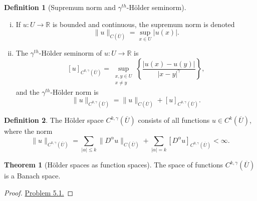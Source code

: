 \documentclass[11pt]{article}
\theoremstyle{definition}
\newtheorem*{theorem}{Theorem}
\newtheorem*{definition}{Definition}
\begin{document}
\begin{definition}[Supremum norm and $\gamma^{th}$-H\"{o}lder seminorm]
\begin{enumerate}[(i)]
\item If $u : U \rightarrow \mathbb{R}$ is bounded and continuous, the supremum norm is denoted
\[\|u\|_{C(\overline{U})} = \sup_{x \in U}{|u(x)|}.\]

\item The $\gamma^{th}$-H\"{o}lder seminorm of $u : U \rightarrow \mathbb{R}$ is
\[[u]_{C^{0,\gamma}(\overline{U})} = \sup_{\substack{x,y\in U \\ x\not= y}}\left\{\frac{|u(x) - u(y)|}{|x-y|^{\gamma}}\right\},\]
and the $\gamma^{th}$-H\"{o}lder norm is
\[\|u\|_{C^{0,\gamma}(\overline{U})} = \|u\|_{C(\overline{U})} + [u]_{C^{0,\gamma}(\overline{U})}.\]
\end{enumerate}
\end{definition}

\begin{definition}
The H\"{o}lder space $C^{k,\gamma}(\overline{U})$ consists of all functions $u \in C^k(\overline{U})$,
where the norm
\[\|u\|_{C^{k,\gamma}(\overline{U})} = \sum_{|\alpha| \leq k}\|D^{\alpha}u\|_{C(\overline{U})} + \sum_{|\alpha| = k}[D^{\alpha}u]_{C^{0,\gamma}(\overline{U})} < \infty.\]
\end{definition}

\begin{theorem}[H\"{o}lder spaces as function spaces]
The space of functions $C^{k,\gamma}(\overline{U})$ is a Banach space.
\end{theorem}
\begin{proof}
\href{https://github.com/Aidenwjt/some-math-notes/blob/master/exercises/evans/exercises.pdf}{Problem 5.1.}
\end{proof}

\newpage
\end{document}
